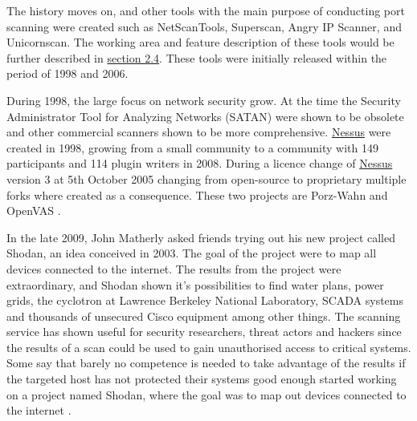 The history moves on, and other tools with the main purpose of conducting port scanning were created such as NetScanTools, Superscan, Angry IP Scanner, and Unicornscan. The working area and feature description of these tools would be further described in \hyperref[s:HowToScanning]{section 2.4}. These tools were initially released within the period of 1998 and 2006.

During 1998, the large focus on network security grow. At the time the Security Administrator Tool for Analyzing Networks (SATAN) were shown to be obsolete and other commercial scanners shown to be more comprehensive. \hyperref[s:HowNessusWorks]{Nessus} were created in 1998, growing from a small community to a community with 149 participants and 114 plugin writers in 2008. During a licence change of \hyperref[s:HowNessusWorks]{Nessus} version 3 at 5th October 2005 changing from open-source to proprietary multiple forks where created as a consequence. These two projects are Porz-Wahn and OpenVAS \autocite{rogers2011nessus}.

In the late 2009, John Matherly asked friends trying out his new project called Shodan, an idea conceived in 2003. The goal of the project were to map all devices connected to the internet. The results from the project were extraordinary, and Shodan shown it's possibilities to find water plans, power grids, the cyclotron at Lawrence Berkeley National Laboratory, SCADA systems and thousands of unsecured Cisco equipment among other things. The scanning service has shown useful for security researchers, threat actors and hackers since the results of a scan could be used to gain unauthorised access to critical systems. Some say that barely no competence is needed to take advantage of the results if the targeted host has not protected their systems good enough started working on a project named Shodan, where the goal was to map out devices connected to the internet \autocite{Shodan2012}.